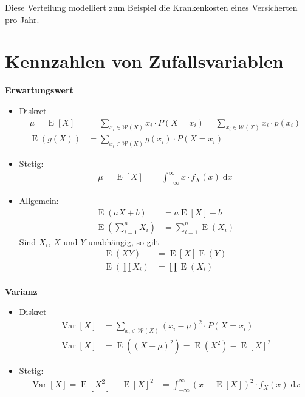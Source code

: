 \documentclass[25pt]{sciposter}
\newcommand{\Var}{\operatorname{Var}}
\newcommand{\E}{\operatorname{E}}
\newcommand{\rmd}{\mathrm{d}}
\newenvironment{method}[1]{\begin{mdframed}[backgroundcolor=blue!10,innertopmargin=15pt, innerbottommargin=15pt,nobreak=true]
		\textbf{#1 }
	}
	{ 
	\end{mdframed}
}
\begin{document}
\begin{multicols}{3}
Diese Verteilung modelliert zum Beispiel die Krankenkosten eines Versicherten pro Jahr.

\newpage 
\section{Kennzahlen von Zufallsvariablen}


\begin{method}{Erwartungswert}
	\begin{itemize}
		\item Diskret
		\begin{align*}
	\mu = \E[X] &= \sum_{x_i \in \mathcal{W}(X)} x_i \cdot P(X=x_i) = \sum_{x_i \in \mathcal{W}(X)} x_i \cdot p(x_i) \\
	\E(g(X)) &= \sum_{x_i \in \mathcal{W}(X)} g(x_i) \cdot P(X=x_i)
	\end{align*}
		\item Stetig:
\begin{align*}
\mu = \E[X] &= \int_{-\infty}^{\infty} x \cdot f_X(x) \; \rmd x
\end{align*}
		
		\item Allgemein:
		\begin{align*}
	\E(aX+b) &= a\E[X] + b\\
	\E \left( \sum_{i=1}^n X_i \right) &= \sum_{i=1}^n \E(X_i)
		\end{align*}	
		Sind $X_i$, $X$ und $Y$ unabhängig, so gilt
		\begin{align*}
		\E(XY) &= \E[X]\E(Y)\\
		\E \left( \prod X_i \right) &= \prod \E(X_i)\\
		\end{align*}
		
	\end{itemize}
	

\end{method}


\begin{method}{Varianz}
\begin{itemize}
\item Diskret
		\begin{align*}
		\Var[X] &= \sum_{x_i \in \mathcal{W}(X)} (x_i - \mu)^2 \cdot P(X=x_i) \\
\Var[X] &= \E((X - \mu)^2) = \E(X^2) - \E[X]^2
	\end{align*}
\item Stetig:
	\begin{align*}
\Var[X] =  \E{[X^2]} - \E{[X]}^2  &= \int_{-\infty}^{\infty} (x - \E[X])^2 \cdot f_X(x) \; \rmd x
\end{align*}


\end{itemize}
\end{method}
\end{multicols}
\end{document}
